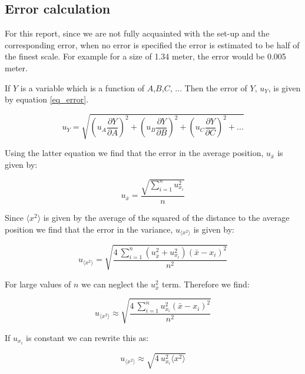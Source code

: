 \subsection{Error calculation}

For this report, since we are not fully acquainted with the set-up and the corresponding error, when no error is specified the error is estimated to be half of the finest scale. For example for a size of 1.34 meter, the error would be 0.005 meter.

If $Y$ is a variable which is a function of $A$,$B$,$C$, ... Then the error of $Y$, $u_Y$, is given by equation \ref{eq_error}.

\begin{equation}
	\label{eq_error}
	u_Y = \sqrt{\left(u_A \frac{\partial Y}{\partial A}\right)^2 + \left(u_B \frac{\partial Y}{\partial B}\right)^2 + \left(u_C \frac{\partial Y}{\partial C}\right)^2 + ...}
\end{equation}

Using the latter equation we find that the error in the average position, $u_{\bar{x}}$ is given by:

\begin{equation}
	\label{eq_u_mean}
	u_{\bar{x}} =  \frac{ \sqrt{ \sum_{i=1}^n u_{x_i}^2}}{n}
\end{equation}

Since $ \langle x^2 \rangle $ is given by the average of the squared of the distance to the average position we find that the error in the variance, $u_{ \langle x^2 \rangle } $ is given by:

\begin{equation}
	\label{eq_u_var}
	u_{ \langle x^2 \rangle }=  \sqrt{ \frac{ 4 \: \sum_{i=1}^n    \left( u_{\bar{x}}^2 + u_{x_i}^2 \right) \left( \bar{x} - x_i \right)^2}{n^2}}
\end{equation}

For large values of $n$ we can neglect the $ u_{\bar{x}}^2$ term. Therefore we find:

\begin{equation}
	\label{eq_u_var_approx}
	u_{ \langle x^2 \rangle } \approx  \sqrt{ \frac{ 4 \: \sum_{i=1}^n    u_{x_i}^2  \left( \bar{x} - x_i \right)^2}{n^2}}
\end{equation}

If $ u_{x_i}$ is constant we can rewrite this as:

\begin{equation}
	u_{ \langle x^2 \rangle } \approx  \sqrt{  4 \:     u_{x_i}^2  \langle x^2 \rangle }
	\label{eq_u_var_constant}
\end{equation}



